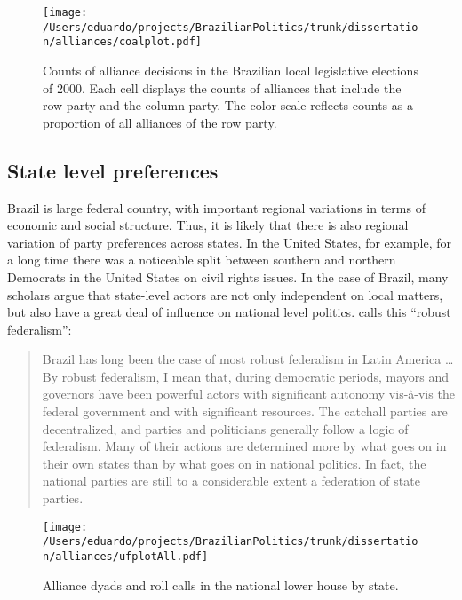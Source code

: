 \begin{landscape}
\begin{figure}
  \centering
  \texttt{[image: /Users/eduardo/projects/BrazilianPolitics/trunk/dissertation/alliances/coalplot.pdf]}
  \caption{Counts of alliance decisions in the Brazilian local legislative elections of 2000. Each cell  displays the counts of  alliances that include the row-party and the column-party. The color scale reflects counts as a  proportion of all alliances of the row party.}
  \label{fig:coalplot}
\end{figure}
\end{landscape}


\subsection{State level preferences}



Brazil is large federal country, with important regional variations in terms of economic and social structure. Thus, it is likely that there is also regional variation of party preferences across states. In the United States, for example, for a long time there was a noticeable split between southern and northern Democrats in the United States on civil rights issues\citep{poole:1997}. In the case of Brazil, many scholars argue that state-level actors are not only independent on local matters, but also have a great deal of influence on national level politics. \citet{mainwaring:1997a} calls this ``robust federalism'': 

\begin{quote}
  Brazil has long been the case of most robust federalism in Latin America \dots By robust federalism, I mean that, during democratic periods, mayors and governors have been powerful actors with significant autonomy vis-à-vis the federal government and with significant resources. The catchall parties are decentralized, and parties and politicians generally follow a logic of federalism. Many of their actions are determined more by what goes on in their own states than by what goes on in national politics. In fact, the national parties are still to a considerable extent a federation of state parties.\citep[p.83]{mainwaring:1997a}\end{quote} 


\begin{figure}
  \centering
  \texttt{[image: /Users/eduardo/projects/BrazilianPolitics/trunk/dissertation/alliances/ufplotAll.pdf]}
  \caption{Alliance dyads and roll calls in the national lower house by state.}
  \label{fig:coalplot}
\end{figure}

